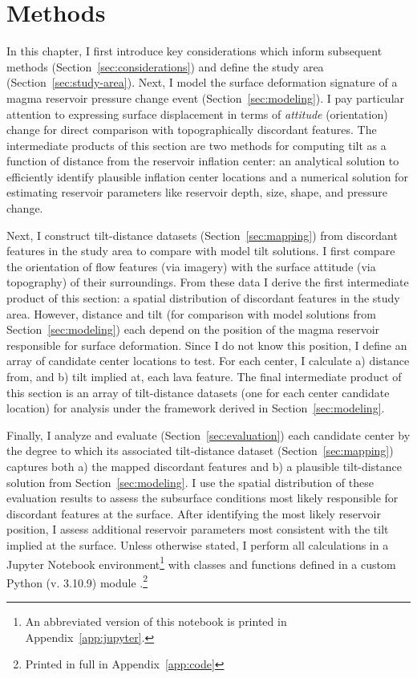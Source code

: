 \chapter{Methods}\label{cha:methods}

In this chapter, I first introduce key considerations which inform subsequent methods (Section~\ref{sec:considerations}) and define the study area (Section~\ref{sec:study-area}). Next, I model the surface deformation signature of a magma reservoir pressure change event (Section~\ref{sec:modeling}). I pay particular attention to expressing surface displacement in terms of \emph{attitude} (orientation) change for direct comparison with topographically discordant features. The intermediate products of this section are two methods for computing tilt as a function of distance from the reservoir inflation center: an analytical solution to efficiently identify plausible inflation center locations and a numerical solution for estimating reservoir parameters like reservoir depth, size, shape, and pressure change.

Next, I construct tilt-distance datasets (Section~\ref{sec:mapping}) from discordant features in the study area to compare with model tilt solutions. I first compare the orientation of flow features (via imagery) with the surface attitude (via topography) of their surroundings. From these data I derive the first intermediate product of this section: a spatial distribution of discordant features in the study area. However, distance and tilt (for comparison with model solutions from Section~\ref{sec:modeling}) each depend on the position of the magma reservoir responsible for surface deformation. Since I do not know this position, I define an array of candidate center locations to test. For each center, I calculate a) distance from, and b) tilt implied at, each lava feature. The final intermediate product of this section is an array of tilt-distance datasets (one for each center candidate location) for analysis under the framework derived in Section~\ref{sec:modeling}.

Finally, I analyze and evaluate (Section~\ref{sec:evaluation}) each candidate center by the degree to which its associated tilt-distance dataset (Section~\ref{sec:mapping}) captures both a) the mapped discordant features and b) a plausible tilt-distance solution from Section~\ref{sec:modeling}. I use the spatial distribution of these evaluation results to assess the subsurface conditions most likely responsible for discordant features at the surface. After identifying the most likely reservoir position, I assess additional reservoir parameters most consistent with the tilt implied at the surface. Unless otherwise stated, I perform all calculations in a Jupyter Notebook environment\footnote{An abbreviated version of this notebook is printed in Appendix~\ref{app:jupyter}.} with classes and functions defined in a custom Python (v. 3.10.9) module .\footnote{Printed in full in Appendix~\ref{app:code}}

